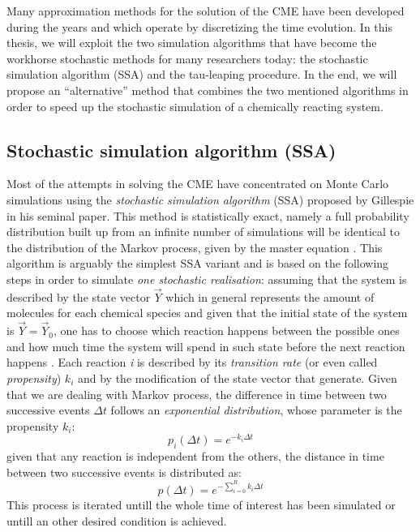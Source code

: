 \documentclass[12pt,a4paper]{report}
\begin{document}
Many approximation methods for the solution of the CME have been developed during the years and which operate by discretizing the time evolution. In this thesis, we will exploit the two simulation algorithms that have become the workhorse stochastic methods for many researchers today: the stochastic simulation algorithm (SSA) and the tau-leaping procedure. In the end, we will propose an ``alternative'' method that combines the two mentioned algorithms in order to speed up the stochastic simulation of a chemically reacting system. 

\subsection{Stochastic simulation algorithm (SSA)}
Most of the attempts in solving the CME have concentrated on Monte Carlo simulations using the \emph{stochastic simulation algorithm} (SSA) proposed by Gillespie in his seminal paper. This method is statistically exact, namely a full probability distribution built up from an infinite number of simulations will be identical to the distribution of the Markov process, given by the master equation \cite{Article}. This algorithm is arguably the simplest SSA variant and is based on the following steps in order to simulate \emph{one stochastic realisation}: assuming that the system is described by the state vector $\Vec{Y}$ which in general represents the amount of molecules for each chemical species and given that the initial state of the system is $\Vec{Y} = \Vec{Y}_{0}$, one has to choose which reaction happens between the possible ones and how much time the system will spend in such state before the next reaction happens \cite{PHD}. Each reaction \emph{i} is described by its \emph{transition rate} (or even called \emph{propensity}) $k_{i}$ and by the modification of the state vector that generate. Given that we are dealing with Markov process, the difference in time between two successive events $\Delta t$ follows an \emph{exponential distribution}, whose parameter is the propensity $k_{i}$:
\begin{equation}
    p_{i}(\Delta t) = e^{-k_{i}\Delta t}
\end{equation}
given that any reaction is independent from the others, the distance in time between two successive events is distributed as:
\begin{equation}\label{exponential}
    p(\Delta t) = e^{-\sum_{i=0}^{R} k_{i} \Delta t}
\end{equation}
This process is iterated untill the whole time of interest has been simulated or untill an other desired condition is achieved.
\end{document}
